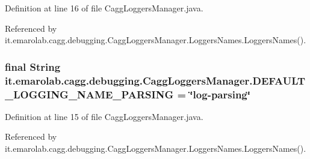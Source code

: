 Definition at line 16 of file Cagg\-Loggers\-Manager.\-java.



Referenced by it.\-emarolab.\-cagg.\-debugging.\-Cagg\-Loggers\-Manager.\-Loggers\-Names.\-Loggers\-Names().

\hypertarget{classit_1_1emarolab_1_1cagg_1_1debugging_1_1CaggLoggersManager_a74281e8f0cdfe13db3ef845431d1a736}{
\subsubsection[{D\-E\-F\-A\-U\-L\-T\-\_\-\-L\-O\-G\-G\-I\-N\-G\-\_\-\-N\-A\-M\-E\-\_\-\-P\-A\-R\-S\-I\-N\-G}]{\setlength{\rightskip}{0pt plus 5cm}final String it.\-emarolab.\-cagg.\-debugging.\-Cagg\-Loggers\-Manager.\-D\-E\-F\-A\-U\-L\-T\-\_\-\-L\-O\-G\-G\-I\-N\-G\-\_\-\-N\-A\-M\-E\-\_\-\-P\-A\-R\-S\-I\-N\-G = \char`\"{}log-\/parsing\char`\"{}\hspace{0.3cm}{\ttfamily [static]}}}\label{classit_1_1emarolab_1_1cagg_1_1debugging_1_1CaggLoggersManager_a74281e8f0cdfe13db3ef845431d1a736}


Definition at line 15 of file Cagg\-Loggers\-Manager.\-java.



Referenced by it.\-emarolab.\-cagg.\-debugging.\-Cagg\-Loggers\-Manager.\-Loggers\-Names.\-Loggers\-Names().

